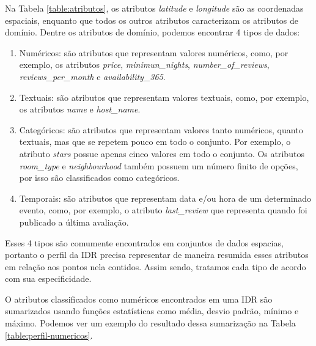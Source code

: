 Na Tabela \ref{table:atributos}, os atributos {\em latitude} e {\em longitude} são as coordenadas espaciais, enquanto que todos os outros atributos caracterizam os atributos de domínio. Dentre os atributos de domínio, podemos encontrar 4 tipos de dados:

\begin{enumerate}
	\item Numéricos: são atributos que representam valores numéricos, como, por exemplo, os atributos {\em price}, {\em minimun\_nights}, {\em number\_of\_reviews}, {\em reviews\_per\_month} e {\em availability\_365}.
	\item Textuais: são atributos que representam valores textuais, como, por exemplo, os atributos {\em name} e {\em host\_name}.
	\item Categóricos: são atributos que representam valores tanto numéricos, quanto textuais, mas que se repetem pouco em todo o conjunto. Por exemplo, o atributo {\em stars} possue apenas cinco valores em todo o conjunto. Os atributos {\em room\_type} e {\em neighbourhood} também possuem um número finito de opções, por isso são classificados como categóricos.
	\item Temporais: são atributos que representam data e/ou hora de um determinado evento, como, por exemplo, o atributo {\em last\_review} que representa quando foi publicado a última avaliação.
\end{enumerate}

Esses 4 tipos são comumente encontrados em conjuntos de dados espacias, portanto o perfil da IDR precisa representar de maneira resumida esses atributos em relação aos pontos nela contidos. Assim sendo, tratamos cada tipo de acordo com sua especificidade.

O atributos classificados como numéricos encontrados em uma IDR são sumarizados usando funções estatísticas como média, desvio padrão, mínimo e máximo. Podemos ver um exemplo do resultado dessa sumarização na Tabela \ref{table:perfil-numericos}.

